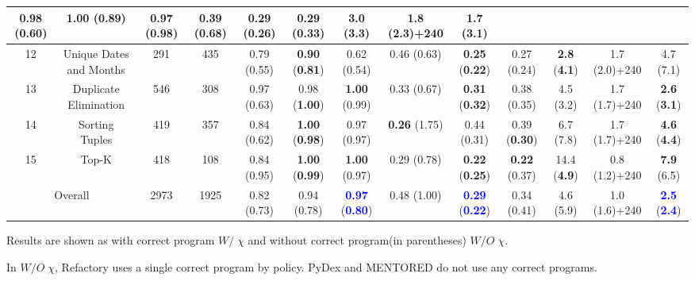 \documentclass[10pt,conference]{IEEEtran}
\begin{document}
\begin{table}[hb!]
{\begin{tabular}{ |c|c|c|c|ccc|ccc|ccc| }
            0.98 (0.60)& \textbf{1.00} (0.89) & 0.97 (\textbf{0.98}) & 
            0.39 (0.68) & \textbf{0.29} (\textbf{0.26}) & \textbf{0.29} (0.33) & 
            3.0 (3.3) & 1.8 (2.3)+240 & \textbf{1.7} (\textbf{3.1}) \\
            \hline
            12 & Unique Dates and Months & 291 & 435 & 
            0.79 (0.55)& \textbf{0.90} (\textbf{0.81}) & 0.62 (0.54) & 
            0.46 (0.63) & \textbf{0.25} (\textbf{0.22}) & 0.27 (0.24) & 
            \textbf{2.8} (\textbf{4.1}) & 1.7 (2.0)+240 & 4.7 (7.1) \\
            \hline
            13 & Duplicate Elimination & 546 & 308 & 
            0.97 (0.63)& 0.98 (\textbf{1.00}) & \textbf{1.00} (0.99) & 
            0.33 (0.67) & \textbf{0.31} (\textbf{0.32}) & 0.38 (0.35) & 
            4.5 (3.2) & 1.7 (1.7)+240 & \textbf{2.6} (\textbf{3.1}) \\
            \hline
            14 & Sorting Tuples & 419 & 357 & 
            0.84 (0.62)& \textbf{1.00} (\textbf{0.98}) & 0.97 (0.97) & 
            \textbf{0.26} (1.75) & 0.44 (0.31) & 0.39 (\textbf{0.30}) & 
            6.7 (7.8) & 1.7 (1.7)+240 & \textbf{4.6} (\textbf{4.4}) \\
            \hline
            15 & Top-K & 418 & 108 & 
            0.84 (0.95)& \textbf{1.00} (\textbf{0.99}) & \textbf{1.00} (0.97) & 
            0.29 (0.78) & \textbf{0.22} (\textbf{0.25}) & \textbf{0.22} (0.37) & 
            14.4 (\textbf{4.9}) & 0.8 (1.2)+240 & \textbf{7.9} (6.5) \\
            \hline\hline
            \multicolumn{2}{|c|}{Overall} & 2973 & 1925 & 
            0.82 (0.73) & 0.94 (0.78) & \textbf{\textcolor{blue}{0.97}} (\textbf{\textcolor{blue}{0.80}}) & 
            0.48 (1.00) & \textbf{\textcolor{blue}{0.29}} (\textbf{\textcolor{blue}{0.22}}) & 0.34 (0.41) & 
            4.6 (5.9) & 1.0 (1.6)+240 & \textbf{\textcolor{blue}{2.5}} (\textbf{\textcolor{blue}{2.4}}) \\
            \hline
        \end{tabular}
    }
    \begin{tablenotes}
        \item Results are shown as with correct program $W/\;\chi$ and without correct program(in parentheses) $W/O\;\chi$.
        \item In $W/O\;\chi$, Refactory uses a single correct program by policy. PyDex and MENTORED do not use any correct programs.
    \end{tablenotes}
\end{table}
\end{document}
